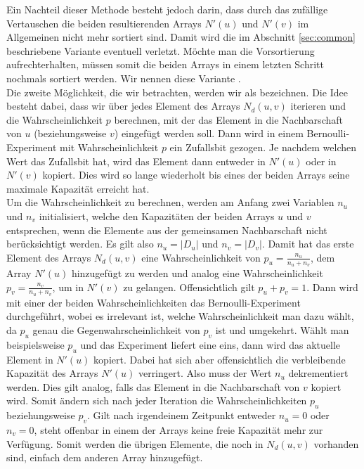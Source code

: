 Ein Nachteil dieser Methode besteht jedoch darin, dass durch das zufällige Vertauschen die beiden resultierenden Arrays
$N'(u)$ und $N'(v)$ im Allgemeinen nicht mehr sortiert sind. 
Damit wird die im Abschnitt \ref{sec:common} beschriebene
Variante eventuell verletzt. Möchte man die Vorsortierung aufrechterhalten, müssen somit die beiden Arrays
in einem letzten Schritt nochmals sortiert werden.
Wir nennen diese Variante \perm.
\\

Die zweite Möglichkeit, die wir betrachten, werden wir als \distr{} bezeichnen.
Die Idee besteht dabei, dass wir über jedes Element des Arrays $N_{d}(u,v)$ iterieren und 
die Wahrscheinlichkeit $p$ berechnen, mit
der das Element in die Nachbarschaft von $u$ (beziehungsweise $v$) eingefügt werden soll. Dann wird in einem 
Bernoulli-Experiment mit Wahrscheinlichkeit $p$ ein Zufallsbit gezogen. Je nachdem welchen
Wert das Zufallsbit hat, wird das Element dann entweder in $N'(u)$ oder in $N'(v)$ kopiert. Dies wird so lange
wiederholt bis eines der beiden Arrays seine maximale Kapazität erreicht hat. 
\\

Um die Wahrscheinlichkeit zu berechnen, werden am Anfang zwei Variablen $n_u$ und $n_v$ initialisiert, 
welche den Kapazitäten der beiden Arrays $u$ und $v$ entsprechen, wenn die Elemente aus der 
gemeinsamen Nachbarschaft nicht berücksichtigt werden. Es gilt also $n_u = |D_{u}|$ und
$n_v= |D_{v}|$.
Damit hat das erste Element des Arrays $N_{d}(u,v)$ eine Wahrscheinlichkeit von $p_u = \frac{n_u}{n_u+n_v}$, dem
Array $N'(u)$ hinzugefügt zu werden und analog eine Wahrscheinlichkeit $p_v = \frac{n_v}{n_u+n_v}$, um
in $N'(v)$ zu gelangen. Offensichtlich gilt $p_u + p_v = 1$. Dann wird mit einer der beiden
Wahrscheinlichkeiten das Bernoulli-Experiment durchgeführt, wobei es irrelevant ist, welche Wahrscheinlichkeit
man dazu wählt, da $p_u$ genau die Gegenwahrscheinlichkeit von $p_v$ ist und umgekehrt. 
Wählt man beispielsweise $p_u$ und das Experiment liefert eine eins, dann wird das aktuelle Element
in $N'(u)$ kopiert. Dabei
hat sich aber offensichtlich die verbleibende Kapazität des Arrays $N'(u)$ verringert. Also muss
der Wert $n_u$ dekrementiert werden. Dies gilt analog, falls das Element in die Nachbarschaft von $v$ kopiert wird.
Somit ändern sich nach jeder Iteration die Wahrscheinlichkeiten $p_u$ beziehungsweise $p_v$.
Gilt nach irgendeinem Zeitpunkt entweder $n_u = 0$ oder $n_v = 0$, steht offenbar in einem der Arrays 
keine freie Kapazität mehr zur Verfügung. Somit werden die übrigen Elemente, die noch in $N_{d}(u,v)$ vorhanden sind, 
einfach dem anderen Array hinzugefügt.
\\

